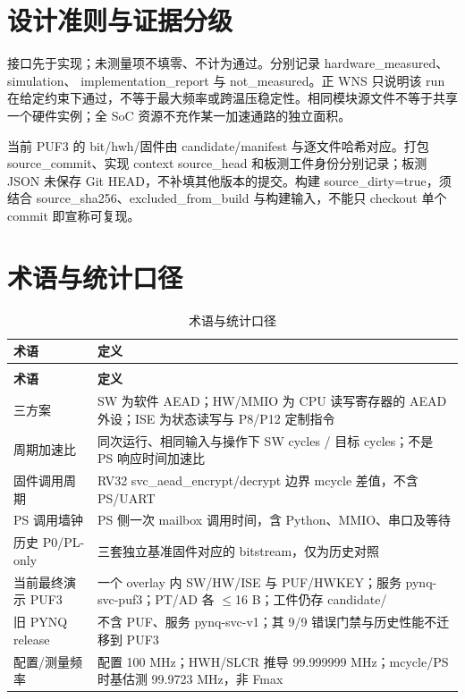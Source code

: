 \Needspace{85pt}

\Needspace{170pt}
\section{设计准则与证据分级}

接口先于实现；未测量项不填零、不计为通过。分别记录 hardware\_measured、simulation、 implementation\_report 与 not\_measured。正 WNS 只说明该 run 在给定约束下通过，不等于最大频率或跨温压稳定性。相同模块源文件不等于共享一个硬件实例；全 SoC 资源不充作某一加速通路的独立面积。

当前 PUF3 的 bit/hwh/固件由 candidate/manifest 与逐文件哈希对应。打包 source\_commit、实现 context source\_head 和板测工件身份分别记录；板测 JSON 未保存 Git HEAD，不补填其他版本的提交。构建 source\_dirty=true，须结合 source\_sha256、excluded\_from\_build 与构建输入，不能只 checkout 单个 commit 即宣称可复现。

\Needspace{85pt}

\Needspace{170pt}
\section{术语与统计口径}

{\small
\setlength{\tabcolsep}{4pt}
\renewcommand{\thetable}{D-2}
\begin{longtable}{@{}>{\raggedright\arraybackslash}p{}>{\raggedright\arraybackslash}p{}@{}}
\caption{术语与统计口径}\label{tab:D-2}\\
\toprule
\textbf{术语} & \textbf{定义} \\
\midrule
\endfirsthead
\multicolumn{2}{@{}l}{\footnotesize 续表 D-2}\\
\toprule
\textbf{术语} & \textbf{定义} \\
\midrule
\endhead
三方案 & SW 为软件 AEAD；HW/MMIO 为 CPU 读写寄存器的 AEAD 外设；ISE 为状态读写与 P8/P12 定制指令 \\
周期加速比 & 同次运行、相同输入与操作下 SW cycles / 目标 cycles；不是 PS 响应时间加速比 \\
固件调用周期 & RV32 svc\_\allowbreak{}aead\_\allowbreak{}encrypt/\allowbreak{}decrypt 边界 mcycle 差值，不含 PS/UART \\
PS 调用墙钟 & PS 侧一次 mailbox 调用时间，含 Python、MMIO、串口及等待 \\
历史 P0/PL-only & 三套独立基准固件对应的 bitstream，仅为历史对照 \\
当前最终演示 PUF3 & 一个 overlay 内 SW/HW/ISE 与 PUF/HWKEY；服务 pynq-svc-puf3；PT/AD 各 $\leq$16 B；工件仍存 candidate/ \\
旧 PYNQ release & 不含 PUF、服务 pynq-svc-v1；其 9/9 错误门禁与历史性能不迁移到 PUF3 \\
配置/测量频率 & 配置 100 MHz；HWH/SLCR 推导 99.999999 MHz；mcycle/PS 时基估测 99.9723 MHz，非 Fmax \\
\bottomrule
\end{longtable}
}
